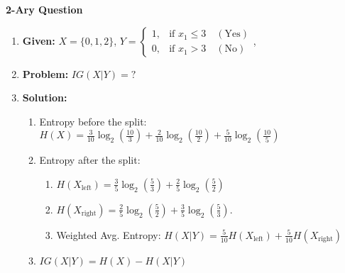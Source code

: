 \begin{example}
\end{example}

\begin{example} \textbf{2-Ary Question}
    \begin{enumerate}
        \item \textbf{Given:} $X= \{0,1,2\}$, $Y = 
        \begin{cases} 
        1, & \text{if } x_1 \leq 3 \quad (\text{Yes}) \\
        0, & \text{if } x_1 > 3 \quad (\text{No})
        \end{cases}$, 
        \item \textbf{Problem:} $IG(X|Y) = ?$
        \item \textbf{Solution:}
        \begin{enumerate}
            \item Entropy before the split: $H(X) = \frac{3}{10} \log_2\left(\frac{10}{3}\right) + \frac{2}{10} \log_2\left(\frac{10}{2}\right) + \frac{5}{10} \log_2\left(\frac{10}{5}\right)$
            \item Entropy after the split: 
            \begin{enumerate}
                \item $H(X_{\text{left}}) = \frac{3}{5} \log_2 \left(\frac{5}{3}\right) + \frac{2}{5} \log_2 \left(\frac{5}{2}\right)$ 
                \item $H(X_{\text{right}}) = \frac{2}{5} \log_2 \left(\frac{5}{2}\right) + \frac{3}{5} \log_2 \left(\frac{5}{3}\right)$.
                \item Weighted Avg. Entropy: $H(X|Y) = \frac{5}{10} H(X_{\text{left}}) + \frac{5}{10} H(X_{\text{right}})$
            \end{enumerate}
            \item $IG(X|Y) = H(X) - H(X|Y)$
        \end{enumerate}
    \end{enumerate}
\end{example}

